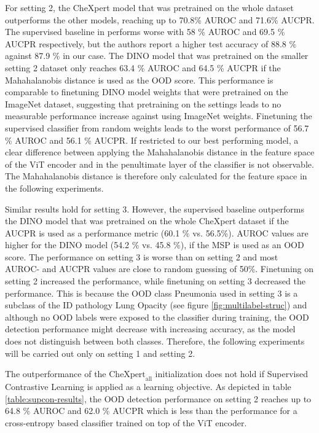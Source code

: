 For setting 2, the CheXpert model that was pretrained on the whole dataset outperforms the other models, reaching up to 70.8\% AUROC and 71.6\% AUCPR.
The supervised baseline in \citep{Berger2021} performs worse with 58 \% AUROC and 69.5 \% AUCPR respectively, but the authors report a higher test accuracy of 88.8 \% against 87.9 \% in our case.
The DINO model that was pretrained on the smaller setting 2 dataset only reaches 63.4 \% AUROC and 64.5 \% AUCPR if the Mahahalanobis distance is used as the OOD score.
This performance is comparable to finetuning DINO model weights that were pretrained on the ImageNet dataset, suggesting that pretraining on the settings leads to no measurable performance increase against using ImageNet weights.
Finetuning the supervised classifier from random weights leads to the worst performance of 56.7 \% AUROC and 56.1 \% AUCPR.
If restricted to our best performing model, a clear difference between applying the Mahahalanobis distance in the feature space of the ViT encoder and in the penultimate layer of the classifier is not observable.
The Mahahalanobis distance is therefore only calculated for the feature space in the following experiments.
\par
Similar results hold for setting 3. However, the supervised baseline outperforms the DINO model that was pretrained on the whole CheXpert dataset if the AUCPR is used as a performance metric (60.1 \% vs. 56.5\%).
AUROC values are higher for the DINO model (54.2 \% vs. 45.8 \%), if the MSP is used as an OOD score.
The performance on setting 3 is worse than on setting 2 and most AUROC- and AUCPR values are close to random guessing of 50\%.
Finetuning on setting 2 increased the performance, while finetuning on setting 3 decreased the performance.
This is because the OOD class Pneumonia used in setting 3 is a subclass of the ID pathology Lung Opacity (see figure \ref{fig:multilabel-struc}) and although no OOD labels were exposed to the classifier during training, the OOD detection performance might decrease with increasing accuracy, as the model does not distinguish between both classes.
Therefore, the following experiments will be carried out only on setting 1 and setting 2.
\par 
The outperformance of the $\text{CheXpert}_\text{all}$ initialization does not hold if Supervised Contrastive Learning is applied as a learning objective.
As depicted in table \ref{table:supcon-results}, the OOD detection performance on setting 2 reaches up to 64.8 \% AUROC and 62.0 \% AUCPR which is less than the performance for a cross-entropy based classifier trained on top of the ViT encoder.
